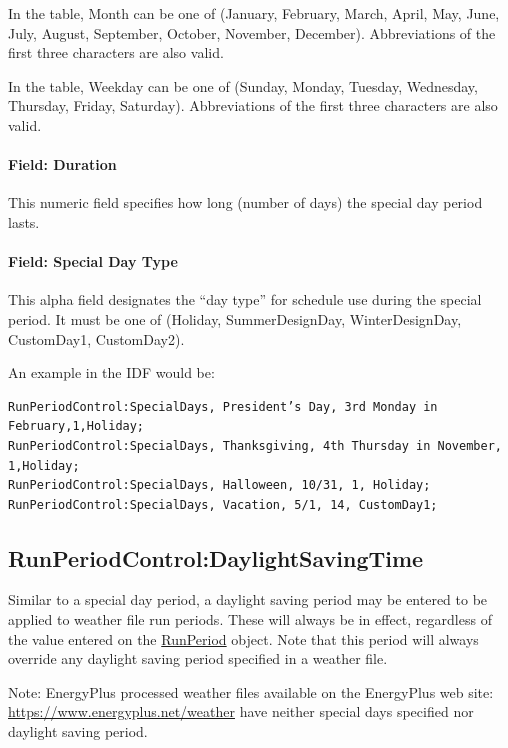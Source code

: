In the table, Month can be one of (January, February, March, April, May, June, July, August, September, October, November, December). Abbreviations of the first three characters are also valid.

In the table, Weekday can be one of (Sunday, Monday, Tuesday, Wednesday, Thursday, Friday, Saturday). Abbreviations of the first three characters are also valid.

\paragraph{Field: Duration}\label{field-duration}

This numeric field specifies how long (number of days) the special day period lasts.

\paragraph{Field: Special Day Type}\label{field-special-day-type}

This alpha field designates the ``day type'' for schedule use during the special period. It must be one of (Holiday, SummerDesignDay, WinterDesignDay, CustomDay1, CustomDay2).

An example in the IDF would be:

\begin{lstlisting}
RunPeriodControl:SpecialDays, President’s Day, 3rd Monday in February,1,Holiday;
RunPeriodControl:SpecialDays, Thanksgiving, 4th Thursday in November, 1,Holiday;
RunPeriodControl:SpecialDays, Halloween, 10/31, 1, Holiday;
RunPeriodControl:SpecialDays, Vacation, 5/1, 14, CustomDay1;
\end{lstlisting}

\subsection{RunPeriodControl:DaylightSavingTime}\label{runperiodcontroldaylightsavingtime}

Similar to a special day period, a daylight saving period may be entered to be applied to weather file run periods. These will always be in effect, regardless of the value entered on the \hyperref[runperiod]{RunPeriod} object. Note that this period will always override any daylight saving period specified in a weather file.

\begin{callout}
Note: EnergyPlus processed weather files available on the EnergyPlus web site: \url{https://www.energyplus.net/weather} have neither special days specified nor daylight saving period.

\end{callout}

